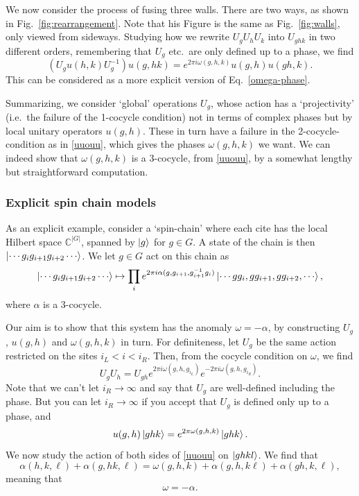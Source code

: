 \documentclass[12pt]{article}
\numberwithin{equation}{section}
\numberwithin{figure}{section}
\theoremstyle{remark}
\def\bC{\mathbb{C}}
\begin{document}
We now consider the process of fusing three walls. There are two ways, as shown in 
Fig.~\ref{fig:rearrangement}.
Note that his Figure is the same as Fig.~\ref{fig:walls}, only viewed from sideways. 
Studying how we rewrite $U_g U_h U_k$ into $U_{ghk}$ in two different orders,
remembering that $U_g$ etc.~are only defined up to a phase,
we find \begin{equation}
( U_g u(h,k) U_g^{-1})  u(g,hk)= e^{2\pi i \omega(g,h,k)} u(g,h) u(gh,k)  .\label{uuouu}
\end{equation}
This can be considered as a more explicit version of Eq.~\ref{omega-phase}.

Summarizing, we consider `global' operations $U_g$,
whose action has a `projectivity' (i.e.~the failure of the 1-cocycle condition)
not in terms of complex phases 
but by local unitary operators $u(g,h)$.
These in turn have a failure in the 2-cocycle-condition as in \eqref{uuouu},
which gives the phases $\omega(g,h,k)$ we want.
We can indeed show  that $\omega(g,h,k)$ is a 3-cocycle, from \eqref{uuouu},
by a somewhat lengthy but straightforward computation.

\subsubsection{Explicit spin chain models}


As an explicit example, consider a `spin-chain' where each cite has the local Hilbert space $\bC^{|G|}$,
spanned by $\ket{g}$ for $g\in G$.
A state of the chain is then $\ket{\cdots g_i g_{i+1} g_{i+2} \cdots}$.
We let $g\in G$ act on this chain as \begin{equation}
\ket{\cdots g_i g_{i+1} g_{i+2} \cdots}
\mapsto 
\prod_i e^{2\pi i \alpha(g,  g_{i+1} ,  g_{i+1}^{-1} g_i )}
\ket{\cdots gg_i ,  gg_{i+1},  gg_{i+2},  \cdots},
\label{explicit-action}
\end{equation}
where $\alpha$ is a 3-cocycle. 

Our aim is to show that this system has the anomaly $\omega=-\alpha$,
by constructing $U_g$, $u(g,h)$ and $\omega(g,h,k)$ in turn.
For definiteness, let $U_g$ be the same action restricted on the sites $i_L < i < i_R$.
Then, from the cocycle condition on $\omega$, we find \begin{equation}
U_g U_h = U_{gh} e^{2\pi i \omega(g,h,g_{i_L} )} e^{-2\pi i \omega(g,h,g_{i_R} )}.
\end{equation} 
Note that we can't let $i_R\to \infty$ and say that $U_g$ are well-defined including the phase.
But you can let $i_R\to \infty$ if you accept that $U_g$ is defined only up to a phase,
and  \begin{equation}
u(g,h) \ket{ghk} = e^{2\pi \omega(g,h,k)} \ket{ghk}.
\end{equation}
We now study the action of both sides of \eqref{uuouu} on $\ket{ghkl}$.
We find that \begin{equation}
\alpha(h,k,\ell) +\alpha(g,hk,\ell) = \omega(g,h,k) + \alpha(g,h,k\ell)
+ \alpha(gh,k,\ell), 
\end{equation} meaning that \begin{equation}
\omega=-\alpha.
\end{equation}
\end{document}
